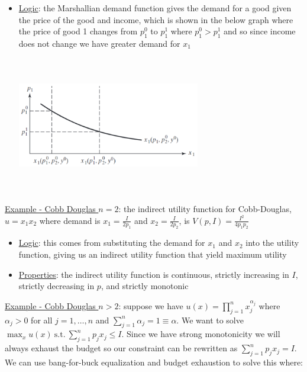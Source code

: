 \documentclass{article}
\begin{document}
  \begin{itemize}
    \item  \underline{Logic}: the Marshallian demand function gives the demand for a good given the price of the good and income, which is shown in the below graph where the price of good 1 changes from $p_{1}^{0}$ to $p_{1}^{1}$ where $p_{1}^{0} > p_{1}^{1}$ and so since income does not change we have greater demand for $x_{1}$
    \\
    \begin{center}
      \includegraphics[width=8cm, height=6cm]{pic25}
    \end{center}
  \end{itemize}
  \par
  \underline{Example - Cobb Douglas $n=2$}: the indirect utility function for Cobb-Douglas, $u = x_{1}x_{2}$ where demand is $x_{1} = \tfrac{I}{2p_{1}}$ and $x_{2} = \tfrac{I}{2p_{2}}$, is $V(p,I) = \tfrac{I^{2}}{4p_{1}p_{2}}$
  \begin{itemize}
    \item  \underline{Logic}: this comes from substituting the demand for $x_{1}$ and $x_{2}$ into the utility function, giving us an indirect utility function that yield maximum utility
    \item  \underline{Properties}: the indirect utility function is continuous, strictly increasing in $I$, strictly decreasing in $p$, and strictly monotonic
  \end{itemize}
  \underline{Example - Cobb Douglas $n>2$}: suppose we have $u(x) = \prod_{j=1}^{n} x_{j}^{\alpha_{j}}$ where $\alpha_{j} > 0$ for all $j = 1, \dots, n$ and $\sum_{j=1}^{n} \alpha_{j} = 1 \equiv \alpha$. We want to solve $\max_{x} u(x) \ \text{s.t.} \ \sum_{j=1}^{n}p_{j}x_{j} \leq I$. Since we have strong monotonicity we will always exhaust the budget so our constraint can be rewritten as $\sum_{j=1}^{n}p_{j}x_{j} = I$. We can use bang-for-buck equalization and budget exhaustion to solve this where:
\end{document}
